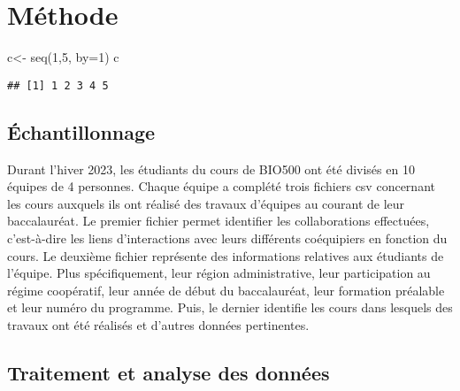 \documentclass[9pt,twocolumn,twoside,]{pnas-new}
\newenvironment{Shaded}{\begin{snugshade}}{\end{snugshade}}
\newcommand{\AttributeTok}[1]{\textcolor[rgb]{0.77,0.63,0.00}{#1}}
\newcommand{\DecValTok}[1]{\textcolor[rgb]{0.00,0.00,0.81}{#1}}
\newcommand{\FunctionTok}[1]{\textcolor[rgb]{0.00,0.00,0.00}{#1}}
\newcommand{\NormalTok}[1]{#1}
\newcommand{\OtherTok}[1]{\textcolor[rgb]{0.56,0.35,0.01}{#1}}
\begin{document}
\hypertarget{muxe9thode}{%
\section{Méthode}\label{muxe9thode}}

\begin{Shaded}
\begin{Highlighting}[]
\NormalTok{c}\OtherTok{\textless{}{-}} \FunctionTok{seq}\NormalTok{(}\DecValTok{1}\NormalTok{,}\DecValTok{5}\NormalTok{, }\AttributeTok{by=}\DecValTok{1}\NormalTok{)}
\NormalTok{c}
\end{Highlighting}
\end{Shaded}

\begin{verbatim}
## [1] 1 2 3 4 5
\end{verbatim}

\hypertarget{uxe9chantillonnage}{%
\subsection{Échantillonnage}\label{uxe9chantillonnage}}

Durant l'hiver 2023, les étudiants du cours de BIO500 ont été divisés en
10 équipes de 4 personnes. Chaque équipe a complété trois fichiers csv
concernant les cours auxquels ils ont réalisé des travaux d'équipes au
courant de leur baccalauréat. Le premier fichier permet identifier les
collaborations effectuées, c'est-à-dire les liens d'interactions avec
leurs différents coéquipiers en fonction du cours. Le deuxième fichier
représente des informations relatives aux étudiants de l'équipe. Plus
spécifiquement, leur région administrative, leur participation au régime
coopératif, leur année de début du baccalauréat, leur formation
préalable et leur numéro du programme. Puis, le dernier identifie les
cours dans lesquels des travaux ont été réalisés et d'autres données
pertinentes.

\hypertarget{traitement-et-analyse-des-donnuxe9es}{%
\subsection{Traitement et analyse des
données}\label{traitement-et-analyse-des-donnuxe9es}}
\end{document}

